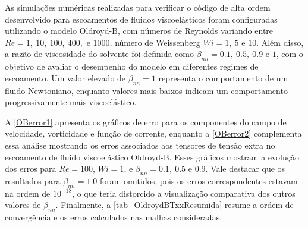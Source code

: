 As simulações numéricas realizadas para verificar o código de alta ordem desenvolvido para escoamentos de fluidos viscoelásticos foram configuradas utilizando o modelo Oldroyd-B, com números de Reynolds variando entre $Re = 1,\ 10,\ 100,\ 400,$ e $1000$, número de Weissenberg $Wi = 1,\ 5$ e $10$. Além disso, a razão de viscosidade do solvente foi definida como $\beta_{nn} = 0.1,\ 0.5,\ 0.9$ e $1$, com o objetivo de avaliar o desempenho do modelo em diferentes regimes de escoamento. Um valor elevado de $\beta_{nn} = 1$ representa o comportamento de um fluido Newtoniano, enquanto valores mais baixos indicam um comportamento progressivamente mais viscoelástico.

A \autoref{OBerror1} apresenta os gráficos de erro para os componentes do campo de velocidade, vorticidade e função de corrente, enquanto a \autoref{OBerror2} complementa essa análise mostrando os erros associados aos tensores de tensão extra no escoamento de fluido viscoelástico Oldroyd-B. Esses gráficos mostram a evolução dos erros para $Re = 100$, $Wi = 1$, e $\beta_{nn} = 0.1,\ 0.5$ e $0.9$. Vale destacar que os resultados para $\beta_{nn} = 1.0$ foram omitidos, pois os erros correspondentes estavam na ordem de $10^{-18}$, o que teria distorcido a visualização comparativa dos outros valores de $\beta_{nn}$. Finalmente, a \autoref{tab_OldroydBTxxResumida} resume a ordem de convergência e os erros calculados nas malhas consideradas.
